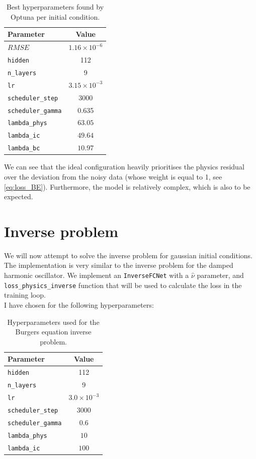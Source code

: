 \documentclass[we,twoside,openright,a4paper,11pt]{uantwerpenbamathesis}
\begin{document}
\begin{table}[H]
\centering
\caption{Best hyperparameters found by Optuna per initial condition.}\label{tab:optuna_best_params_BE}
\begin{tabular}{lc}
\toprule
\textbf{Parameter} & \textbf{Value}\\
\midrule
$RMSE$           & $1.16\times10^{-6}$\\
\midrule
\texttt{hidden}              & 112   \\
\texttt{n\_layers}           & 9     \\
\texttt{lr}                  & $3.15\times10^{-3}$\\
\texttt{scheduler\_step}     & 3000  \\
\texttt{scheduler\_gamma}    & 0.635  \\
\texttt{lambda\_phys}        & $63.05$\\
\texttt{lambda\_ic}          & $49.64$  \\
\texttt{lambda\_bc}          & $10.97$ \\
\bottomrule
\end{tabular}
\end{table}
We can see that the ideal configuration heavily prioritises the physics residual over the deviation from the noisy data (whose weight is equal to 1, see \ref{eq:loss_BE}). Furthermore, the model is relatively complex, which is also to be expected.

\section{Inverse problem}
We will now attempt to solve the inverse problem for gaussian initial conditions. The implementation is very similar to the inverse problem for the damped harmonic oscillator. We implement an \verb|InverseFCNet| with a $\hat\nu$ parameter, and \verb|loss_physics_inverse| function that will be used to calculate the loss in the training loop.\\

I have chosen for the following hyperparameters:
\begin{table}[H]
\centering
\caption{Hyperparameters used for the Burgers equation inverse problem.}\label{tab:inverse_hyperparameters_BE}
\begin{tabular}{lc}
\toprule
\textbf{Parameter} & \textbf{Value}\\
\midrule
\texttt{hidden}              & 112   \\
\texttt{n\_layers}           & 9     \\
\texttt{lr}                  & $3.0\times10^{-3}$\\
\texttt{scheduler\_step}     & 3000  \\
\texttt{scheduler\_gamma}    & 0.6  \\
\texttt{lambda\_phys}        & $10$\\
\texttt{lambda\_ic}          & $100$  \\
\bottomrule
\end{tabular}
\end{table}
 
\end{document}
